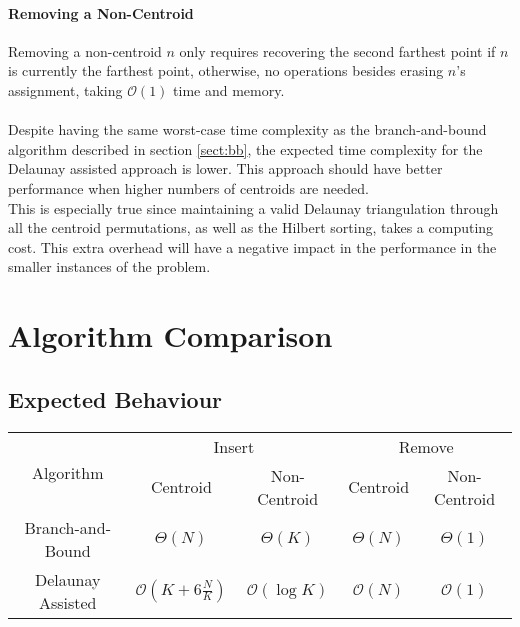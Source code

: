 \paragraph{Removing a Non-Centroid}
Removing a non-centroid $n$ only requires recovering the second farthest point if $n$ is currently the farthest point, otherwise, no operations besides erasing $n$'s assignment, taking $\mathcal{O}(1)$ time and memory.

\paragraph{}
Despite having the same worst-case time complexity as the branch-and-bound algorithm described in section \ref{sect:bb}, the expected time complexity for the Delaunay assisted approach is lower. This approach should have better performance when higher numbers of centroids are needed.\\
This is especially true since maintaining a valid Delaunay triangulation through all the centroid permutations, as well as the Hilbert sorting, takes a computing cost. This extra overhead will have a negative impact in the performance in the smaller instances of the problem.\\

\section{Algorithm Comparison}

\subsection{Expected Behaviour}

\begin{center}
\begin{tabular}{|c|c|c|c|c|}
	\hline
	\multirow{2}{*}{Algorithm}	& \multicolumn{2}{c|}{Insert}	& \multicolumn{2}{c|}{Remove}	\\ \cline{2-5}
								& Centroid		& Non-Centroid	& Centroid		& Non-Centroid	\\ \hline
		Branch-and-Bound		& $\Theta(N)$ & $\Theta(K)$ 
									& $\Theta(N)$ & $\Theta(1)$ \\ \hline
		Delaunay Assisted		& $\mathcal{O}(K+6\frac{N}{K})$& $\mathcal{O}(\log{K})$
									& $\mathcal{O}(N)$ & $\mathcal{O}(1)$\\ \hline
\end{tabular}
\end{center}

